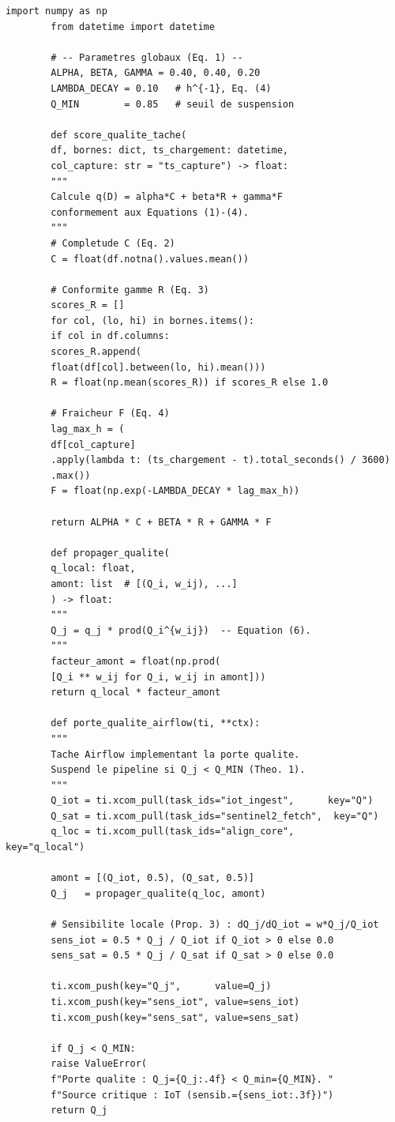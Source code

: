 \documentclass[12pt,a4paper]{article}
\theoremstyle{plain}
\theoremstyle{definition}
\theoremstyle{remark}
\begin{document}
	\begin{lstlisting}[caption={Porte qualite : calcul et propagation de $Q_j$},
		label={lst:qgate}]
		import numpy as np
		from datetime import datetime
		
		# -- Parametres globaux (Eq. 1) --
		ALPHA, BETA, GAMMA = 0.40, 0.40, 0.20
		LAMBDA_DECAY = 0.10   # h^{-1}, Eq. (4)
		Q_MIN        = 0.85   # seuil de suspension
		
		def score_qualite_tache(
		df, bornes: dict, ts_chargement: datetime,
		col_capture: str = "ts_capture") -> float:
		"""
		Calcule q(D) = alpha*C + beta*R + gamma*F
		conformement aux Equations (1)-(4).
		"""
		# Completude C (Eq. 2)
		C = float(df.notna().values.mean())
		
		# Conformite gamme R (Eq. 3)
		scores_R = []
		for col, (lo, hi) in bornes.items():
		if col in df.columns:
		scores_R.append(
		float(df[col].between(lo, hi).mean()))
		R = float(np.mean(scores_R)) if scores_R else 1.0
		
		# Fraicheur F (Eq. 4)
		lag_max_h = (
		df[col_capture]
		.apply(lambda t: (ts_chargement - t).total_seconds() / 3600)
		.max())
		F = float(np.exp(-LAMBDA_DECAY * lag_max_h))
		
		return ALPHA * C + BETA * R + GAMMA * F
		
		def propager_qualite(
		q_local: float,
		amont: list  # [(Q_i, w_ij), ...]
		) -> float:
		"""
		Q_j = q_j * prod(Q_i^{w_ij})  -- Equation (6).
		"""
		facteur_amont = float(np.prod(
		[Q_i ** w_ij for Q_i, w_ij in amont]))
		return q_local * facteur_amont
		
		def porte_qualite_airflow(ti, **ctx):
		"""
		Tache Airflow implementant la porte qualite.
		Suspend le pipeline si Q_j < Q_MIN (Theo. 1).
		"""
		Q_iot = ti.xcom_pull(task_ids="iot_ingest",      key="Q")
		Q_sat = ti.xcom_pull(task_ids="sentinel2_fetch",  key="Q")
		q_loc = ti.xcom_pull(task_ids="align_core",       key="q_local")
		
		amont = [(Q_iot, 0.5), (Q_sat, 0.5)]
		Q_j   = propager_qualite(q_loc, amont)
		
		# Sensibilite locale (Prop. 3) : dQ_j/dQ_iot = w*Q_j/Q_iot
		sens_iot = 0.5 * Q_j / Q_iot if Q_iot > 0 else 0.0
		sens_sat = 0.5 * Q_j / Q_sat if Q_sat > 0 else 0.0
		
		ti.xcom_push(key="Q_j",      value=Q_j)
		ti.xcom_push(key="sens_iot", value=sens_iot)
		ti.xcom_push(key="sens_sat", value=sens_sat)
		
		if Q_j < Q_MIN:
		raise ValueError(
		f"Porte qualite : Q_j={Q_j:.4f} < Q_min={Q_MIN}. "
		f"Source critique : IoT (sensib.={sens_iot:.3f})")
		return Q_j
	\end{lstlisting}
	
\end{document}
